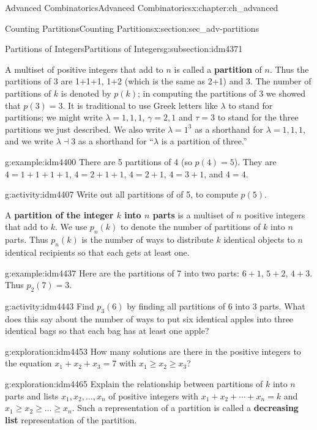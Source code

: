 \documentclass[oneside,10pt,]{book}
\newcommand{\terminology}[1]{\textbf{#1}}
\numberwithin{equation}{chapter}
\begin{document}
\begin{chapterptx}{Advanced Combinatorics}{}{Advanced Combinatorics}{}{}{x:chapter:ch_advanced}
\begin{sectionptx}{Counting Partitions}{}{Counting Partitions}{}{}{x:section:sec_adv-partitions}
\begin{subsectionptx}{Partitions of Integers}{}{Partitions of Integers}{}{}{g:subsection:idm4371}
\par
A multiset of positive integers that add to \(n\) is called a \terminology{partition} of \(n\). Thus the partitions of 3 are 1+1+1, 1+2 (which is the same as 2+1) and 3. The number of partitions of \(k\) is denoted by \(p(k)\); in computing the partitions of 3 we showed that \(p(3) = 3\). It is traditional to use Greek letters like \(\lambda\) to stand for partitions; we might write \(\lambda = 1,1,1\), \(\gamma= 2,1\) and \(\tau = 3\) to stand for the three partitions we just described. We also write \(\lambda = 1^3\) as a shorthand for \(\lambda = 1,1,1\), and we write \(\lambda \dashv 3\) as a shorthand for ``\(\lambda\) is a partition of three.''%
\begin{example}{}{g:example:idm4400}%
There are 5 partitions of 4 (so \(p(4) = 5\)).  They are \(4=1+1+1+1\), \(4=2+1+1\), \(4=2+1\), \(4=3+1\), and \(4=4\).\end{example}
\begin{activity}{}{g:activity:idm4407}%
Write out all partitions of of 5, to compute \(p(5)\).%
\end{activity}
A \terminology{partition of the integer \(k\) into \(n\) parts} is a multiset of \(n\) positive integers that add to \(k\). We use \(p_n(k)\) to denote the number of partitions of \(k\) into \(n\) parts. Thus \(p_n(k)\) is the number of ways to distribute \(k\) identical objects to \(n\) identical recipients so that each gets at least one.%
\begin{example}{}{g:example:idm4437}%
Here are the partitions of 7 into two parts: \(6+1\), \(5+2\), \(4+3\).  Thus \(p_2(7) = 3\).%
\end{example}
\begin{activity}{}{g:activity:idm4443}%
Find \(p_3(6)\) by finding all partitions of 6 into 3 parts. What does this say about the number of ways to put six identical apples into three identical bags so that each bag has at least one apple?%
\end{activity}
\begin{exploration}{}{g:exploration:idm4453}%
How many solutions are there in the positive integers to the equation \(x_1+x_2+x_3 =7\) with \(x_1\ge x_2\ge x_3\)?%
\end{exploration}
\begin{exploration}{}{g:exploration:idm4465}%
Explain the relationship between partitions of \(k\) into \(n\) parts and lists \(x_1,x_2,\ldots,x_n\) of positive integers with \(x_1 + x_2 + \cdots + x_n = k\) and \(x_1\ge x_2\ge\ldots \ge x_n\). Such a representation of a partition is called a \terminology{decreasing list} representation of the partition.%

\end{exploration}
\end{subsectionptx}
\end{sectionptx}
\end{chapterptx}
\end{document}
